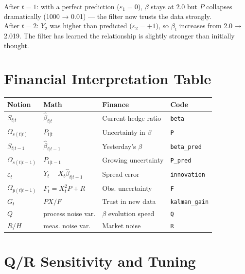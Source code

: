 \documentclass[10pt,a4paper,twocolumn]{article}
\begin{document}
\begin{tcolorbox}[resultbox={Interpretation}]
After $t=1$: with a perfect prediction ($\varepsilon_1=0$), $\beta$ stays at 2.0
but $P$ collapses dramatically (1000 → 0.01) --- the filter now trusts the
data strongly.\\[2pt]
After $t=2$: $Y_2$ was higher than predicted ($\varepsilon_2=+1$), so $\beta_t$
increases from 2.0 → 2.019.  The filter has learned the relationship is
slightly stronger than initially thought.
\end{tcolorbox}

\section{Financial Interpretation Table}

\begin{center}
{\small
\begin{tabular}{@{}llll@{}}
\toprule
Notion & Math & Finance & Code\\\midrule
$S_{t|t}$ & $\hat\beta_{t|t}$ & Current hedge ratio & \texttt{beta}\\
$\Omega_{s(t|t)}$ & $P_{t|t}$ & Uncertainty in $\beta$ & \texttt{P}\\
$S_{t|t-1}$ & $\hat\beta_{t|t-1}$ & Yesterday's $\beta$ & \texttt{beta\_pred}\\
$\Omega_{s(t|t-1)}$ & $P_{t|t-1}$ & Growing uncertainty & \texttt{P\_pred}\\
$\varepsilon_t$ & $Y_t - X_t\hat\beta_{t|t-1}$ & Spread error & \texttt{innovation}\\
$\Omega_{y(t|t-1)}$ & $F_t = X_t^2 P + R$ & Obs. uncertainty & \texttt{F}\\
$G_t$ & $PX/F$ & Trust in new data & \texttt{kalman\_gain}\\
$Q$ & process noise var. & $\beta$ evolution speed & \texttt{Q}\\
$R/H$ & meas. noise var. & Market noise & \texttt{R}\\
\bottomrule
\end{tabular}
}
\end{center}

\section{Q/R Sensitivity and Tuning}
\end{document}
